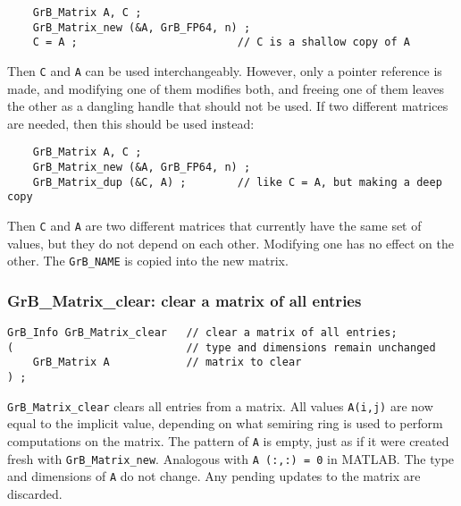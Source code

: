 \documentclass[12pt]{article}
\begin{document}
    {\footnotesize
    \begin{verbatim}
    GrB_Matrix A, C ;
    GrB_Matrix_new (&A, GrB_FP64, n) ;
    C = A ;                         // C is a shallow copy of A  \end{verbatim}}

Then \verb'C' and \verb'A' can be used interchangeably.  However, only a
pointer reference is made, and modifying one of them modifies both, and freeing
one of them leaves the other as a dangling handle that should not be used.  If
two different matrices are needed, then this should be used instead:

    {\footnotesize
    \begin{verbatim}
    GrB_Matrix A, C ;
    GrB_Matrix_new (&A, GrB_FP64, n) ;
    GrB_Matrix_dup (&C, A) ;        // like C = A, but making a deep copy \end{verbatim}}

Then \verb'C' and \verb'A' are two different matrices that currently have the
same set of values, but they do not depend on each other.  Modifying one has
no effect on the other.
The \verb'GrB_NAME' is copied into the new matrix.

\subsubsection{{\sf GrB\_Matrix\_clear:}        clear a matrix of all entries}
\label{matrix_clear}

\begin{mdframed}[userdefinedwidth=6in]
{\footnotesize
\begin{verbatim}
GrB_Info GrB_Matrix_clear   // clear a matrix of all entries;
(                           // type and dimensions remain unchanged
    GrB_Matrix A            // matrix to clear
) ;
\end{verbatim} } \end{mdframed}

\verb'GrB_Matrix_clear' clears all entries from a matrix.  All values
\verb'A(i,j)' are now equal to the implicit value, depending on what semiring
ring is used to perform computations on the matrix.  The pattern of \verb'A' is
empty, just as if it were created fresh with \verb'GrB_Matrix_new'.  Analogous
with \verb'A (:,:) = 0' in MATLAB.  The type and dimensions of \verb'A' do not
change.  Any pending updates to the matrix are discarded.
\end{document}
